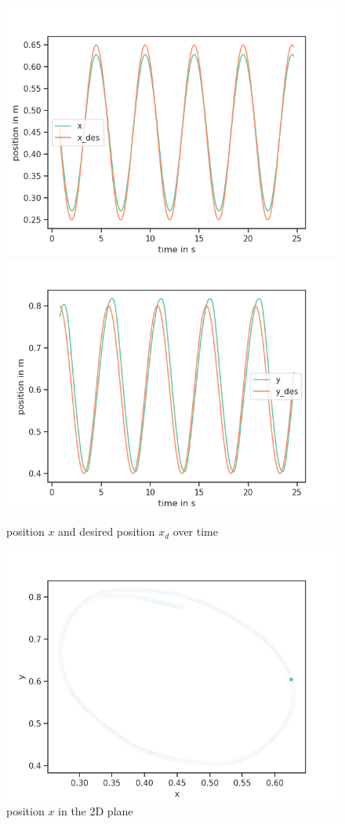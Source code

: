 \documentclass[a4paper,10pt]{article}
\begin{document}
\begin{figure}[H]
  \centering
  \includegraphics[scale=0.6]{img/C3_x0_xd0}
  \includegraphics[scale=0.6]{img/C3_x1_xd1}
  \caption{position $x$ and desired position $x_d$ over time}
\end{figure}


\begin{figure}[H]
  \centering
  \includegraphics[scale=0.6]{img/C3_2D_plane_x}
  \caption{position $x$ in the 2D plane}
\end{figure}
\end{document}
